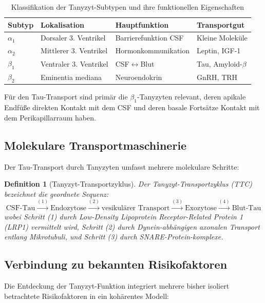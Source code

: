 ﻿\documentclass[12pt,a4paper]{article}
\newtheorem{definition}[theorem]{Definition}
\theoremstyle{definition}
\begin{document}
	\begin{table}[H]
		\centering
		\caption{Klassifikation der Tanyzyt-Subtypen und ihre funktionellen Eigenschaften}
		\label{tab:tanyzyten_klassen}
		\begin{tabular}{llll}
			\toprule
			\textbf{Subtyp} & \textbf{Lokalisation} & \textbf{Hauptfunktion} & \textbf{Transportgut} \\
			\midrule
			$\alpha_1$ & Dorsaler 3. Ventrikel & Barrierefunktion CSF & Kleine Moleküle \\
			$\alpha_2$ & Mittlerer 3. Ventrikel & Hormonkommunikation & Leptin, IGF-1 \\
			$\beta_1$  & Ventraler 3. Ventrikel & CSF$\leftrightarrow$Blut & Tau, Amyloid-$\beta$ \\
			$\beta_2$  & Eminentia mediana & Neuroendokrin & GnRH, TRH \\
			\bottomrule
		\end{tabular}
	\end{table}
	
	Für den Tau-Transport sind primär die $\beta_1$-Tanyzyten relevant, deren apikale Endfüße direkten Kontakt mit dem CSF und deren basale Fortsätze Kontakt mit dem Perikapillarraum haben.
	
	\subsection{Molekulare Transportmaschinerie}
	
	Der Tau-Transport durch Tanyzyten umfasst mehrere molekulare Schritte:
	
	\begin{definition}[Tanyzyt-Transportzyklus]
		Der \emph{Tanyzyt-Transportzyklus} (TTC) bezeichnet die geordnete Sequenz:
		\[
		\text{CSF-Tau} \xrightarrow{(1)} \text{Endozytose} \xrightarrow{(2)} \text{vesikulärer Transport} \xrightarrow{(3)} \text{Exozytose} \xrightarrow{(4)} \text{Blut-Tau}
		\]
		wobei Schritt (1) durch Low-Density Lipoprotein Receptor-Related Protein 1 (LRP1) vermittelt wird, Schritt (2) durch Dynein-abhängigen axonalen Transport entlang Mikrotubuli, und Schritt (3) durch SNARE-Protein-komplexe.
	\end{definition}
	
	\subsection{Verbindung zu bekannten Risikofaktoren}
	
	Die Entdeckung der Tanyzyt-Funktion integriert mehrere bisher isoliert betrachtete Risikofaktoren in ein kohärentes Modell:
	
\end{document}
